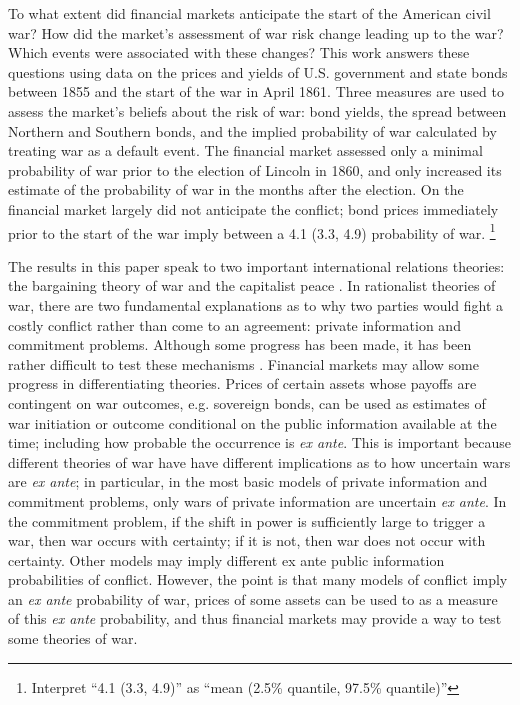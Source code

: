 

\newcommand{\UCn}{Union and Confederacy}
\newcommand{\UCa}{Union and Confederate}


To what extent did financial markets anticipate the start of the American civil war?
How did the market's assessment of war risk change leading up to the war?
Which events were associated with these changes?
This work answers these questions using data on the prices and yields of U.S. government and state bonds between 1855 and the start of the war in April 1861.
Three measures are used to assess the market's beliefs about the risk of war: bond yields, the spread between Northern and Southern bonds, and the implied probability of war calculated by treating war as a default event.
The financial market assessed only a minimal probability of war prior to the election of Lincoln in 1860, and only increased its estimate of the probability of war in the months after the election.
On the financial market largely did not anticipate the conflict; bond prices immediately prior to the start of the war imply between a 4.1 (3.3, 4.9) probability of war.%
\footnote{Interpret ``4.1 (3.3, 4.9)'' as ``mean (2.5\% quantile, 97.5\% quantile)''}

The results in this paper speak to two important international relations theories: the bargaining theory of war \parencite{Fearon1995} and the capitalist peace \parencites{GartzkeLiEtAl2001a}{GartzkeLi2003}.
In rationalist theories of war, there are two fundamental explanations as to why two parties would fight a costly conflict rather than come to an agreement: private information and commitment problems.
Although some progress has been made, it has been rather difficult to test these mechanisms \parencite{Reiter2003}.
Financial markets may allow some progress in differentiating theories.
Prices of certain assets whose payoffs are contingent on war outcomes, e.g. sovereign bonds, can be used as estimates of war initiation or outcome conditional on the public information available at the time; including how probable the occurrence is \textit{ex ante}.
This is important because different theories of war have have different implications as to how uncertain wars are \textit{ex ante}; in particular, in the most basic models of private information and commitment problems, only wars of private information are uncertain \textit{ex ante}.
In the commitment problem, if the shift in power is sufficiently large to trigger a war, then war occurs with certainty; if it is not, then war does not occur with certainty.
Other models may imply different ex ante public information probabilities of conflict.
However, the point is that many models of conflict imply an \textit{ex ante} probability of war, prices of some assets can be used to as a measure of this \textit{ex ante} probability, and thus financial markets may provide a way to test some theories of war.

